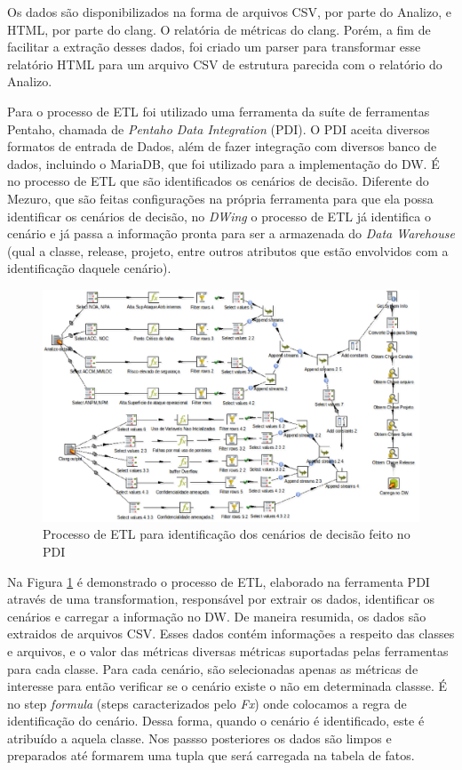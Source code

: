 %
Os dados são disponibilizados na forma de arquivos CSV, por parte do Analizo, e HTML, por parte do clang. O relatória de métricas do clang. Porém, a fim de facilitar a extração desses dados, foi criado um parser para transformar esse relatório HTML para um arquivo CSV de estrutura parecida com o relatório do Analizo.


Para o processo de ETL foi utilizado uma ferramenta da suíte de ferramentas Pentaho, chamada de \emph{Pentaho Data Integration} (PDI). O PDI aceita diversos formatos de entrada de Dados, além de fazer integração com diversos banco de dados, incluindo o MariaDB, que foi utilizado para a implementação do DW. É no processo de ETL que são identificados os cenários de decisão. Diferente do Mezuro, que são feitas configurações na própria ferramenta para que ela possa identificar os cenários de decisão, no \emph{DWing} o processo de ETL já identifica o cenário e já passa a informação pronta para ser a armazenada do \emph{Data Warehouse} (qual a classe, release, projeto, entre outros atributos que estão envolvidos com a identificação daquele cenário).


\begin{figure}[H]
 	\centering
 		\includegraphics[scale=0.5]{figuras/dw-etlpdi}
 		\caption{Processo de ETL para identificação dos cenários de decisão feito no PDI}
 		\label{dw-etl-pdi}
 \end{figure}

Na Figura \ref{dw-etl-pdi} é demonstrado o processo de ETL, elaborado na ferramenta PDI através de uma transformation, responsável por extrair os dados, identificar os cenários e carregar a informação no DW. De maneira resumida, os dados são extraidos de arquivos CSV. Esses dados contém informações a respeito das classes e arquivos, e o valor das métricas diversas métricas suportadas pelas ferramentas para cada classe. Para cada cenário, são selecionadas apenas as métricas de interesse para então verificar se o cenário existe o não em determinada classse. É no step \emph{formula} (steps caracterizados pelo \emph{Fx}) onde colocamos a regra de identificação do cenário. Dessa forma, quando o cenário é identificado, este é atribuído a aquela classe. Nos passso posteriores os dados são limpos e preparados até formarem uma tupla que será carregada na tabela de fatos. %


